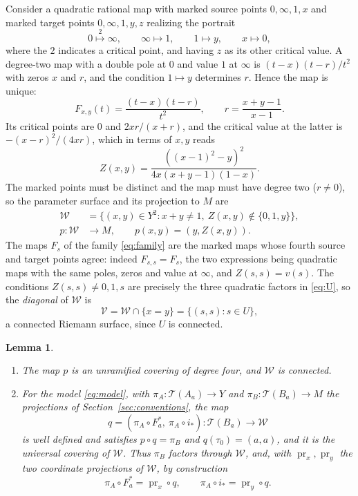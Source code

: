 \documentclass[11pt]{article}
\newcommand{\Teich}{\mathcal T}
\newcommand{\W}{\mathcal W}
\newcommand{\V}{\mathcal V}
\newcommand{\pr}{\operatorname{pr}}
\newtheorem{lemma}[theorem]{Lemma}
\theoremstyle{remark}
\numberwithin{equation}{section}
\begin{document}
Consider a quadratic rational map with marked source points $0,\infty,1,x$
and marked target points $0,\infty,1,y,z$ realizing the portrait
\begin{equation}\label{eq:portrait}
 0\stackrel{2}{\longmapsto}\infty,\qquad
 \infty\longmapsto1,\qquad 1\longmapsto y,\qquad
 x\longmapsto0,
\end{equation}
where the $2$ indicates a critical point, and having $z$ as its other
critical value. A degree-two map with a double pole at $0$ and value $1$ at
$\infty$ is $(t-x)(t-r)/t^2$ with zeros $x$ and $r$, and the condition
$1\mapsto y$ determines $r$. Hence the map is unique:
\begin{equation}\label{eq:Fxy}
 F_{x,y}(t)=\frac{(t-x)(t-r)}{t^2},
 \qquad r=\frac{x+y-1}{x-1}.
\end{equation}
Its critical points are $0$ and $2xr/(x+r)$, and the critical value at the
latter is $-(x-r)^2/(4xr)$, which in terms of $x,y$ reads
\begin{equation}\label{eq:Z}
 Z(x,y)=\frac{((x-1)^2-y)^2}{4x(x+y-1)(1-x)} .
\end{equation}
The marked points must be distinct and the map must have degree two
($r\ne0$), so the parameter surface and its projection to $M$ are
\begin{align}
 \W&=\{(x,y)\in Y^2:x+y\ne1,\ Z(x,y)\notin\{0,1,y\}\},
 \label{eq:W}\\
 p\colon\W&\longrightarrow M,\qquad p(x,y)=(y,Z(x,y)).
 \label{eq:p}
\end{align}
The maps $F_s$ of the family \eqref{eq:family} are the marked maps whose
fourth source and target points agree: indeed $F_{s,s}=F_s$, the two
expressions being quadratic maps with the same poles, zeros and value at
$\infty$, and $Z(s,s)=v(s)$. The conditions $Z(s,s)\ne0,1,s$ are precisely
the three quadratic factors in \eqref{eq:U}, so the \emph{diagonal} of
$\W$ is
\begin{equation}\label{eq:V}
 \V=\W\cap\{x=y\}=\{(s,s):s\in U\},
\end{equation}
a connected Riemann surface, since $U$ is connected.

\begin{lemma}\label{lem:cover}
\begin{enumerate}
\item The map $p$ is an unramified covering of degree four, and $\W$ is
connected.
\item For the model \eqref{eq:model}, with $\pi_A\colon\Teich(A_a)\to Y$
and $\pi_B\colon\Teich(B_a)\to M$ the projections of
Section~\ref{sec:conventions}, the map
\[
 q=(\pi_A\circ F_a^*,\ \pi_A\circ i_*)\colon\Teich(B_a)\longrightarrow\W
\]
is well defined and satisfies $p\circ q=\pi_B$ and $q(\tau_0)=(a,a)$, and
it is the universal covering of $\W$. Thus $\pi_B$ factors through $\W$,
and, with $\pr_x,\pr_y$ the two coordinate projections of $\W$, by
construction
\begin{equation}\label{eq:liftmaps}
 \pi_A\circ F_a^*=\pr_x\circ q,\qquad
 \pi_A\circ i_*=\pr_y\circ q .
\end{equation}
\end{enumerate}
\end{lemma}
\end{document}
